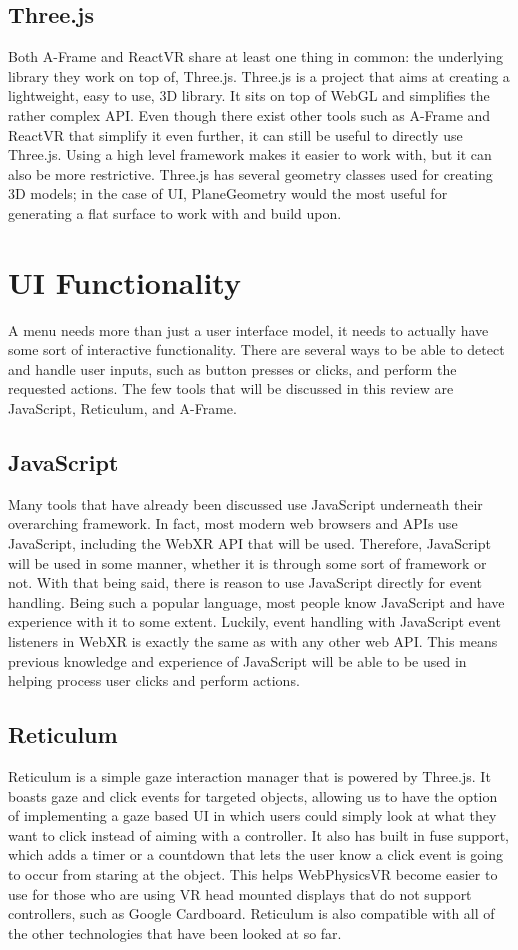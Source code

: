 \documentclass[draftclsnofoot,onecolumn,letterpaper,10pt]{article}
\begin{document}
\subsection{Three.js}
Both A-Frame and ReactVR share at least one thing in common: the underlying library they work on top of, Three.js. Three.js is a project that aims at creating a lightweight, easy to use, 3D library. It sits on top of WebGL and simplifies the rather complex API.\cite{three1} Even though there exist other tools such as A-Frame and ReactVR that simplify it even further, it can still be useful to directly use Three.js. Using a high level framework makes it easier to work with, but it can also be more restrictive. Three.js has several geometry classes used for creating 3D models; in the case of UI, PlaneGeometry would the most useful for generating a flat surface to work with and build upon.\cite{three2}

\section{UI Functionality}
A menu needs more than just a user interface model, it needs to actually have some sort of interactive functionality. There are several ways to be able to detect and handle user inputs, such as button presses or clicks, and perform the requested actions. The few tools that will be discussed in this review are JavaScript, Reticulum, and A-Frame.

\subsection{JavaScript}
Many tools that have already been discussed use JavaScript underneath their overarching framework. In fact, most modern web browsers and APIs use JavaScript, including the WebXR API that will be used. Therefore, JavaScript will be used in some manner, whether it is through some sort of framework or not. With that being said, there is reason to use JavaScript directly for event handling. Being such a popular language, most people know JavaScript and have experience with it to some extent. Luckily, event handling with JavaScript event listeners in WebXR is exactly the same as with any other web API. This means previous knowledge and experience of JavaScript will be able to be used in helping process user clicks and perform actions.

\subsection{Reticulum}
Reticulum is a simple gaze interaction manager that is powered by Three.js. It boasts gaze and click events for targeted objects, allowing us to have the option of implementing a gaze based UI in which users could simply look at what they want to click instead of aiming with a controller. It also has built in fuse support, which adds a timer or a countdown that lets the user know a click event is going to occur from staring at the object. This helps WebPhysicsVR become easier to use for those who are using VR head mounted displays that do not support controllers, such as Google Cardboard. Reticulum is also compatible with all of the other technologies that have been looked at so far.\cite{ret}
\end{document}
